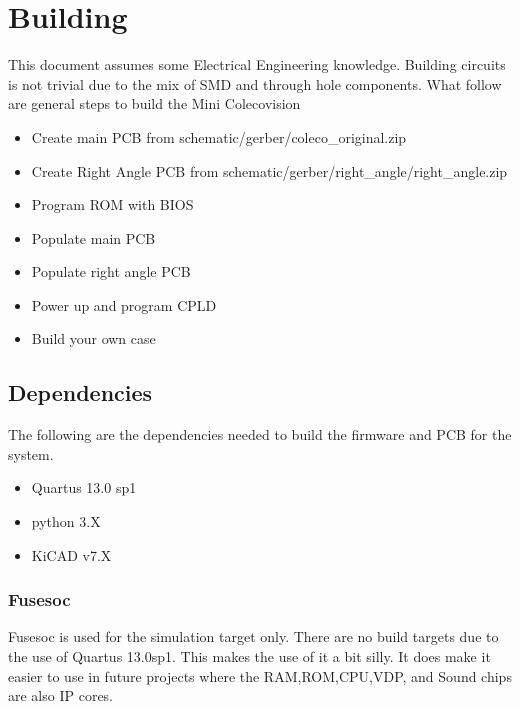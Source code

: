 \section{Building}

\par
This document assumes some Electrical Engineering knowledge. Building circuits is not
trivial due to the mix of SMD and through hole components. What follow are general
steps to build the Mini Colecovision

\begin{itemize}
  \item Create main PCB from schematic/gerber/coleco\_original.zip
  \item Create Right Angle PCB from schematic/gerber/right\_angle/right\_angle.zip
  \item Program ROM with BIOS
  \item Populate main PCB
  \item Populate right angle PCB
  \item Power up and program CPLD
  \item Build your own case
\end{itemize}

\subsection{Dependencies}

\par
The following are the dependencies needed to build the firmware and PCB for the system.

\begin{itemize}
  \item Quartus 13.0 sp1
  \item python 3.X
  \item KiCAD v7.X
\end{itemize}



\subsubsection{Fusesoc}


\par
Fusesoc is used for the simulation target only. There are no build targets due to the use of Quartus 13.0sp1.
This makes the use of it a bit silly. It does make it easier to use in future projects where the RAM,ROM,CPU,VDP,
and Sound chips are also IP cores.


